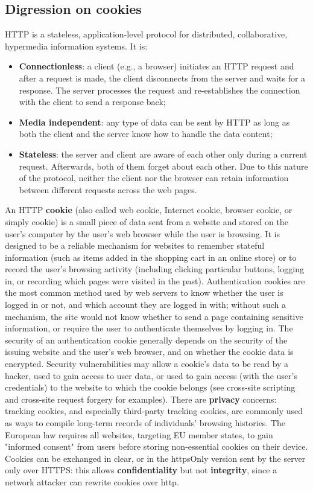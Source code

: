 \documentclass[a4paper, 10pt, titlepage]{article}
\begin{document}
\subsection{Digression on cookies}
HTTP is a stateless, application-level protocol for distributed, collaborative, hypermedia information systems. It is:
\begin{itemize}
\item \textbf{Connectionless}: a client (e.g., a browser) initiates an HTTP request and after a request is made, the client disconnects from the server and waits for a response. The server processes the request and re-establishes the connection with the client to send a response back;
\item \textbf{Media independent}: any type of data can be sent by HTTP as long as both the client and the server know how to handle the data content;
\item \textbf{Stateless}: the server and client are aware of each other only during a current request. Afterwards, both of them forget about each other. Due to this nature of the protocol, neither the client nor the browser can retain information between different requests across the web pages.
\end{itemize}
An HTTP \textbf{cookie} (also called web cookie, Internet cookie, browser cookie, or simply cookie) is a small piece of data sent from a website and stored on the user's computer by the user's web browser while the user is browsing. It is designed to be a reliable mechanism for websites to remember stateful information (such as items added in the shopping cart in an online store) or to record the user's browsing activity (including clicking particular buttons, logging in, or recording which pages were visited in the past). Authentication cookies are the most common method used by web servers to know whether the user is logged in or not, and which account they are logged in with; without such a mechanism, the site would not know whether to send a page containing sensitive information, or require the user to authenticate themselves by logging in. The security of an authentication cookie generally depends on the security of the issuing website and the user's web browser, and on whether the cookie data is encrypted. Security vulnerabilities may allow a cookie's data to be read by a hacker, used to gain access to user data, or used to gain access (with the user's credentials) to the website to which the cookie belongs (see cross-site scripting and cross-site request forgery for examples). There are \textbf{privacy} concerns: tracking cookies, and especially third-party tracking cookies, are commonly used as ways to compile long-term records of individuals' browsing histories. The European law requires all websites, targeting EU member states, to gain "informed consent" from users before storing non-essential cookies on their device. \medskip\\
Cookies can be exchanged in clear, or in the httpsOnly version sent by the server only over HTTPS: this allows \textbf{confidentiality} but not \textbf{integrity}, since a network attacker can rewrite cookies over http.
\end{document}
